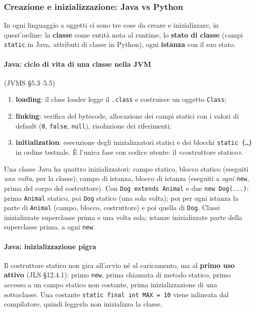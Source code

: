 \documentclass[a4paper,12pt]{article}
\begin{document}
\subsubsection{Creazione e inizializzazione: Java vs Python}
In ogni linguaggio a oggetti ci sono tre cose da creare e inizializzare, in quest'ordine: la
\textbf{classe} come entità nota al runtime, lo \textbf{stato di classe} (campi
\texttt{static} in Java, attributi di classe in Python), ogni \textbf{istanza} con il suo stato.

\paragraph{Java: ciclo di vita di una classe nella JVM} (JVMS §5.3--5.5)
\begin{enumerate}[nosep]
  \item \textbf{loading}: il class loader legge il \texttt{.class} e costruisce un oggetto
        \texttt{Class};
  \item \textbf{linking}: verifica del bytecode, allocazione dei campi statici con i valori di
        default (\texttt{0}, \texttt{false}, \texttt{null}), risoluzione dei riferimenti;
  \item \textbf{initialization}: esecuzione degli inizializzatori statici e dei blocchi
        \texttt{static \{\dots\}} in ordine testuale. È l'unica fase con codice utente: il
        «costruttore statico».
\end{enumerate}
Una classe Java ha quattro inizializzatori: campo statico, blocco statico (eseguiti
\emph{una volta}, per la classe); campo di istanza, blocco di istanza (eseguiti a \emph{ogni}
\texttt{new}, prima del corpo del costruttore). Con \texttt{Dog extends Animal} e due
\texttt{new Dog(...)}: prima \texttt{Animal} statico, poi \texttt{Dog} statico (una sola
volta); poi per ogni istanza la parte di \texttt{Animal} (campo, blocco, costruttore) e poi
quella di \texttt{Dog}. Classi inizializzate superclasse prima e una volta sola; istanze
inizializzate parte della superclasse prima, a ogni \texttt{new}.

\paragraph{Java: inizializzazione pigra} Il costruttore statico non gira all'avvio né al
caricamento, ma al \textbf{primo uso attivo} (JLS §12.4.1): primo \texttt{new}, prima chiamata di
metodo statico, primo accesso a un campo statico non costante, prima inizializzazione di una
sottoclasse. Una costante \texttt{static final int MAX = 10} viene inlineata dal compilatore,
quindi leggerla non inizializza la classe.
\end{document}

